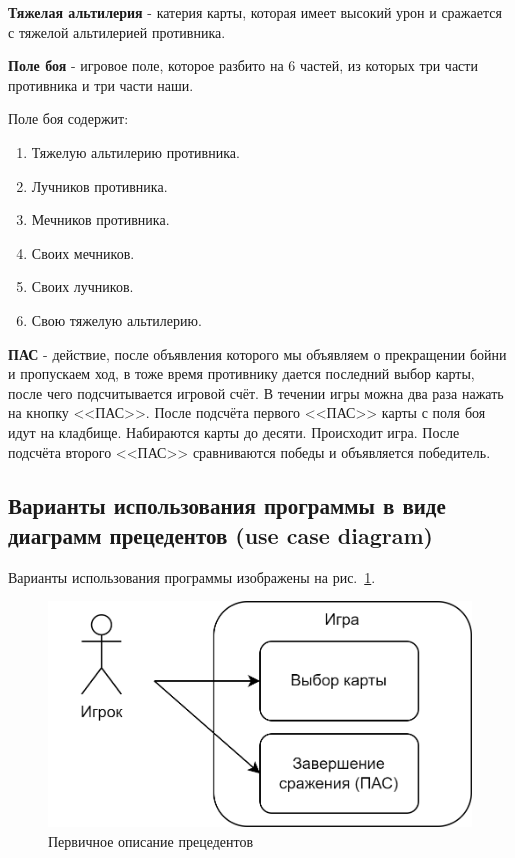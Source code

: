 \documentclass[12pt, a4paper, simple]{eskdtext}
\begin{document}
    \textbf{Тяжелая альтилерия} - катерия карты, которая имеет высокий урон и сражается с тяжелой альтилерией противника.

    \textbf{Поле боя} - игровое поле, которое разбито на 6 частей, из которых три части противника и три части наши.
    
    Поле боя содержит:

    \begin{enumerate}
        \item [1.] Тяжелую альтилерию противника.
        \item [2.] Лучников противника.
        \item [3.] Мечников противника.
        \item [4.] Своих мечников.
        \item [5.] Своих лучников.
        \item [6.] Свою тяжелую альтилерию.
    \end{enumerate}

    \textbf{ПАС} - действие, после объявления которого мы объявляем о прекращении бойни и пропускаем ход, в тоже время противнику дается последний выбор карты,
    после чего подсчитывается игровой счёт. В течении игры можна два раза нажать на кнопку <<ПАС>>.
    После подсчёта первого <<ПАС>> карты с поля боя идут на кладбище. Набираются карты до десяти.
    Происходит игра. После подсчёта второго <<ПАС>> сравниваются победы и объявляется победитель.

    \newpage
    \subsection{Варианты использования программы в виде диаграмм прецедентов (use case diagram)}

    Варианты использования программы изображены на рис.~\ref{fig:game__use_case_diagram}.

    \begin{figure}[!h]
        \centering
        \includegraphics[]
            {../sources/game_architecture/build/game__use_case_diagram.png}
        \caption{Первичное описание прецедентов}
        \label{fig:game__use_case_diagram}
    \end{figure}
\end{document}

